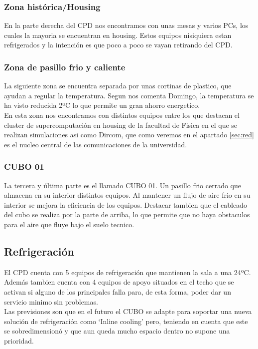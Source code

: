 \documentclass[a4paper,11pt]{article}
\begin{document}
\subsubsection{Zona histórica/Housing}
En la parte derecha del CPD nos encontramos con unas mesas y varios PCs, los cuales la mayoria se encuentran en housing. Estos equipos nisiquiera estan refrigerados y la intención es que poco a poco se vayan retirando del CPD.
\subsubsection{Zona de pasillo frio y caliente}
La siguiente zona se encuentra separada por unas cortinas de plastico, que ayudan a regular la temperatura. Segun nos comenta Domingo, la temperatura se ha visto reducida 2ºC lo que permite un gran ahorro energetico.\\
En esta zona nos encontramos con distintos equipos entre los que destacan el cluster de supercomputación en housing de la facultad de Fisica en el que se realizan simulaciones asi como Dircom, que como veremos en el apartado \ref{sec:red} es el nucleo central de las comunicaciones de la universidad.

\subsubsection{CUBO 01}
La tercera y última parte es el llamado CUBO 01. Un pasillo frio cerrado que almacena en su interior distintos equipos. Al mantener un flujo de aire frio en su interior se mejora la eficiencia de los equipos. Destacar tambien que el cableado del cubo se realiza por la parte de arriba, lo que permite que no haya obstaculos para el aire que fluye bajo el suelo tecnico.

\subsection{Refrigeración}
El CPD cuenta con 5 equipos de refrigeración que mantienen la sala a una 24ºC. Además tambien cuenta con 4 equipos de apoyo situados en el techo que se activan si alguno de los principales falla para, de esta forma, poder dar un servicio minimo sin problemas.\\
Las previsiones son que en el futuro el CUBO se adapte para soportar una nueva solución de refrigeración como `Inline cooling' pero, teniendo en cuenta que este se sobredimensionó y que aun queda mucho espacio dentro no supone una prioridad.
\end{document}

